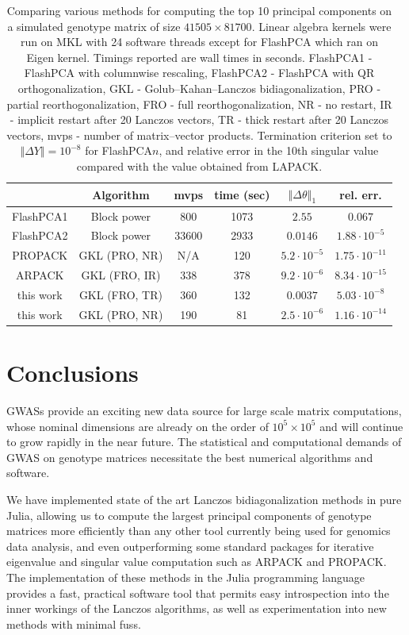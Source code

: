 \documentclass[review]{siamart0516}
\begin{document}
\begin{table}
\begin{tabular}{|c|c|c|c|c|c|}
\hline
 & Algorithm & mvps & time (sec) & $\left\Vert \Delta\theta\right\Vert _{1}$ & rel. err. \tabularnewline
\hline
\hline
FlashPCA1 & Block power & 800 & 1073 & $2.55$ & $0.067$ \tabularnewline
\hline
FlashPCA2 & Block power & 33600 & 2933 & $0.0146$ & $1.88\cdot10^{-5}$ \tabularnewline
\hline
PROPACK & GKL (PRO, NR) & N/A & 120 & $5.2\cdot10^{-5}$ & $1.75\cdot10^{-11}$ \tabularnewline
\hline
ARPACK & GKL (FRO, IR) & 338 & 378 & $9.2\cdot10^{-6}$ & $8.34\cdot10^{-15}$ \tabularnewline
\hline
this work & GKL (FRO, TR) & 360 & 132 & $0.0037$ & $5.03\cdot10^{-8}$ \tabularnewline
\hline
this work & GKL (PRO, NR) & 190 & 81 & $2.5\cdot10^{-6}$ & $1.16\cdot10^{-14}$ \tabularnewline
\hline
\end{tabular}

\caption{Comparing various methods for computing the top 10 principal
components on a simulated genotype matrix of size $41505\times81700$.
Linear algebra kernels were run on MKL with 24 software threads except for
FlashPCA which ran on Eigen kernel.
Timings reported are wall times in seconds.
FlashPCA1 - FlashPCA with columnwise rescaling,
FlashPCA2 - FlashPCA with QR orthogonalization,
GKL - Golub--Kahan--Lanczos bidiagonalization,
PRO - partial reorthogonalization,
FRO - full reorthogonalization,
NR - no restart,
IR - implicit restart after 20 Lanczos vectors,
TR - thick restart after 20 Lanczos vectors,
mvps - number of matrix--vector products.
Termination criterion set to $\Vert \Delta Y\Vert = 10^{-8}$ for FlashPCA$n$,
and relative error in the 10th singular value compared with the value obtained from LAPACK.
\label{tab:shootout}
}
\end{table}


\section{Conclusions}

GWASs provide an exciting new data source for large scale matrix
computations, whose nominal dimensions are already on the order of $10^5
\times 10^5$ and will continue to grow rapidly in the near future.  The
statistical and computational demands of GWAS on genotype matrices
necessitate the best numerical algorithms and software.

We have implemented state of the art Lanczos bidiagonalization methods in
pure Julia, allowing us to compute the largest principal components of
genotype matrices more efficiently than any other tool currently being
used for genomics data analysis, and even outperforming some standard
packages for iterative eigenvalue and singular value computation such as
ARPACK and PROPACK. The implementation of these methods in the Julia
programming language provides a fast, practical software tool that permits
easy introspection into the inner workings of the Lanczos algorithms, as
well as experimentation into new methods with minimal fuss.
\end{document}

